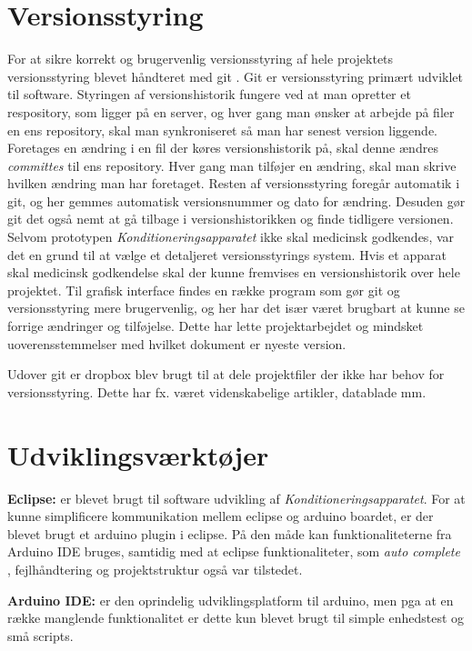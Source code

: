 \section{Versionsstyring}
For at sikre korrekt og brugervenlig versionsstyring af hele projektets versionsstyring blevet håndteret med git . Git er versionsstyring primært udviklet til software. Styringen af versionshistorik fungere ved at man opretter et respository, som ligger på en server, og hver gang man ønsker at arbejde på filer en ens repository, skal man synkroniseret så man har senest version liggende. Foretages en ændring i en fil der køres versionshistorik på, skal denne ændres \textit{committes} til ens repository. Hver gang man tilføjer en ændring, skal man skrive hvilken ændring man har foretaget. Resten af versionsstyring foregår automatik i git, og her gemmes automatisk versionsnummer og dato for ændring. Desuden gør git det også nemt at gå tilbage i versionshistorikken og finde tidligere versionen. 
Selvom prototypen \textit{Konditioneringsapparatet} ikke skal medicinsk godkendes, var det en grund til at vælge et detaljeret versionsstyrings system. Hvis et apparat skal medicinsk godkendelse skal der kunne fremvises en versionshistorik over hele projektet. 
Til grafisk interface findes en række program som gør git og versionsstyring mere brugervenlig, og her har det især været brugbart at kunne se forrige ændringer og tilføjelse. Dette har lette projektarbejdet og mindsket uoverensstemmelser med hvilket dokument er nyeste version. 

Udover git er dropbox blev brugt til at dele projektfiler der ikke har behov for versionsstyring. Dette har fx. været videnskabelige artikler, datablade mm. 

\section{Udviklingsværktøjer}
\textbf{Eclipse:} er blevet brugt til software udvikling af \textit{Konditioneringsapparatet}. For at kunne simplificere kommunikation mellem eclipse og arduino boardet, er der blevet brugt et arduino plugin i eclipse. På den måde kan funktionaliteterne fra Arduino IDE bruges, samtidig med at eclipse funktionaliteter, som \textit{auto complete }, fejlhåndtering og projektstruktur også var tilstedet. 

\textbf{Arduino IDE:} er den oprindelig udviklingsplatform til arduino, men pga at en række manglende funktionalitet er dette kun blevet brugt til simple enhedstest og små scripts. 

